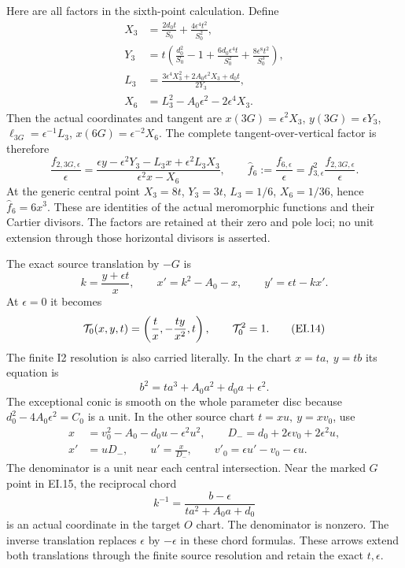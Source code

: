 Here are all factors in the sixth-point calculation. Define
\[
 \begin{aligned}
 X_3&=\frac{2d_0t}{S_0}+\frac{4\epsilon^4t^2}{S_0^2},\\
 Y_3&=t\left(\frac{d_0^2}{S_0}-1+
          \frac{6d_0\epsilon^4t}{S_0^2}
          +\frac{8\epsilon^8t^2}{S_0^3}\right),\\
 L_3&=\frac{3\epsilon^4X_3^2+2A_0\epsilon^2X_3+d_0t}
                     {2Y_3},\\
 X_6&=L_3^2-A_0\epsilon^2-2\epsilon^4X_3.
 \end{aligned}
 \tag{EI.11}
\]
Then the actual coordinates and tangent are
\(x(3G)=\epsilon^2X_3\), \(y(3G)=\epsilon Y_3\),
\(\ell_{3G}=\epsilon^{-1}L_3\), \(x(6G)=\epsilon^{-2}X_6\).
The complete tangent-over-vertical factor is therefore
\[
 \frac{f_{2,3G,\epsilon}}{\epsilon}
 =\frac{\epsilon y-\epsilon^2Y_3-L_3x+
                         \epsilon^2L_3X_3}
             {\epsilon^2x-X_6},\qquad
 \widehat f_6:=\frac{f_{6,\epsilon}}{\epsilon}
       =f_{3,\epsilon}^2\frac{f_{2,3G,\epsilon}}{\epsilon}.
 \tag{EI.12}
\]
At the generic central point \(X_3=8t\), \(Y_3=3t\),
\(L_3=1/6\), \(X_6=1/36\), hence
\(\widehat f_6=6x^3\). These are identities of the actual
meromorphic functions and their Cartier divisors. The factors
are retained at their zero and pole loci; no unit extension
through those horizontal divisors is asserted.

The exact source translation by \(-G\) is
\[
 k=\frac{y+\epsilon t}{x},\qquad
 x'=k^2-A_0-x,\qquad y'=\epsilon t-kx'.
 \tag{EI.13}
\]
At \(\epsilon=0\) it becomes
\[
 {\cal T}_0(x,y,t)=\left(\frac t x,-\frac{ty}{x^2},t\right),
 \qquad {\cal T}_0^2=1.
 \tag{EI.14}
\]
The finite I2 resolution is also carried literally. In the
chart \(x=t a,\ y=t b\) its equation is
\[
 b^2=t a^3+A_0a^2+d_0a+\epsilon^2.
 \tag{EI.15}
\]
The exceptional conic is smooth on the whole parameter disc
because \(d_0^2-4A_0\epsilon^2=C_0\) is a unit. In the
other source chart \(t=xu,\ y=xv_0\), use
\[
 \begin{aligned}
 x&=v_0^2-A_0-d_0u-\epsilon^2u^2,\qquad
 D_-=d_0+2\epsilon v_0+2\epsilon^2u,\\
 x'&=uD_-,\qquad u'=\frac{x}{D_-},\qquad
 v'_0=\epsilon u'-v_0-\epsilon u.
 \end{aligned}
 \tag{EI.16}
\]
The denominator is a unit near each central intersection.
Near the marked \(G\) point in EI.15, the reciprocal chord
\[
 k^{-1}=\frac{b-\epsilon}{t a^2+A_0a+d_0}
 \tag{EI.17}
\]
is an actual coordinate in the target \(O\) chart. The denominator
is nonzero. The inverse translation replaces \(\epsilon\) by
\(-\epsilon\) in these chord formulas. These arrows extend both
translations through the finite source resolution and retain
the exact \(t,\epsilon\).

